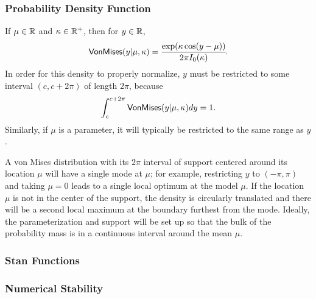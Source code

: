 \subsubsection{Probability Density Function}

If $\mu \in \reals$ and $\kappa \in \posreals$, then for $y \in
\reals$,
%
\[
\distro{VonMises}(y|\mu,\kappa)
=
\frac{\exp(\kappa\cos(y-\mu))}{2\pi I_0(\kappa)}
\!.
\]
%
In order for this density to properly normalize, $y$ must be
restricted to some interval  $(c, c + 2\pi)$ of length $2 \pi$,
because
%
\[
\int_{c}^{c + 2\pi} \distro{VonMises}(y|\mu,\kappa) dy
= 1.
\]
%
Similarly, if $\mu$ is a parameter, it will typically be restricted to
the same range as $y$.

A von Mises distribution with its $2 \pi$ interval of support centered
around its location $\mu$ will have a single mode at $\mu$; for
example, restricting $y$ to $(-\pi,\pi)$ and taking $\mu = 0$ leads to
a single local optimum at the model $\mu$.  If the location $\mu$ is
not in the center of the support, the density is circularly translated
and there will be a second local maximum at the boundary furthest from
the mode.  Ideally, the parameterization and support will be set up so
that the bulk of the probability mass is in a continuous interval
around the mean $\mu$.


\subsubsection{Stan Functions}

\begin{description}
\end{description}

\begin{description}
\end{description}
\subsubsection{Numerical Stability}

